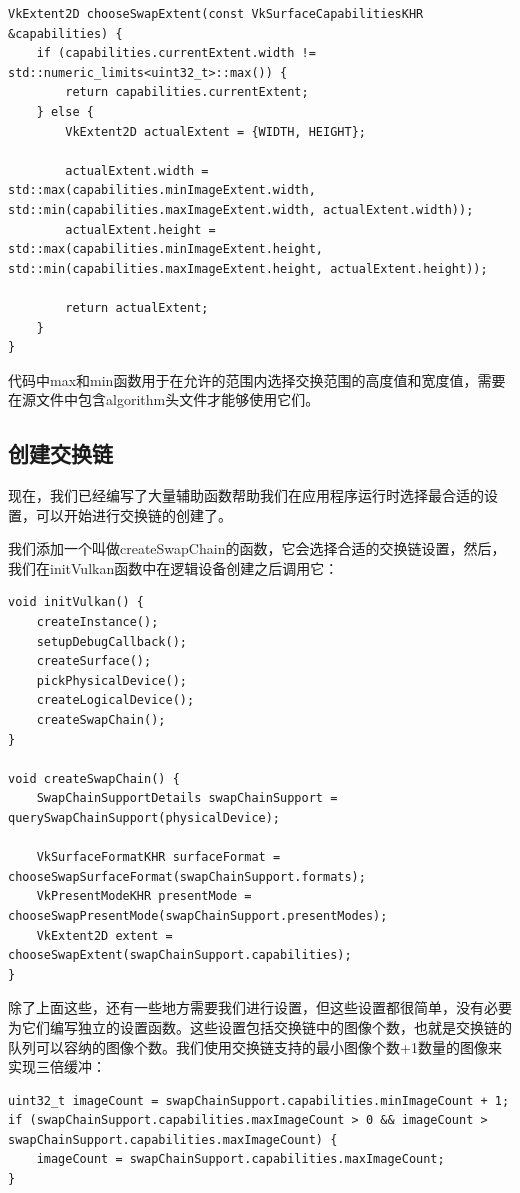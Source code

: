 \documentclass{ctexart}
\begin{document}
\begin{lstlisting}[language={[ANSI]C}]
VkExtent2D chooseSwapExtent(const VkSurfaceCapabilitiesKHR &capabilities) {
	if (capabilities.currentExtent.width != std::numeric_limits<uint32_t>::max()) {
		return capabilities.currentExtent;
	} else {
		VkExtent2D actualExtent = {WIDTH, HEIGHT};

		actualExtent.width = std::max(capabilities.minImageExtent.width, std::min(capabilities.maxImageExtent.width, actualExtent.width));
		actualExtent.height = std::max(capabilities.minImageExtent.height, std::min(capabilities.maxImageExtent.height, actualExtent.height));

		return actualExtent;
	}
}
\end{lstlisting}

代码中max和min函数用于在允许的范围内选择交换范围的高度值和宽度值，需要在源文件中包含algorithm头文件才能够使用它们。

\subsection{创建交换链}

现在，我们已经编写了大量辅助函数帮助我们在应用程序运行时选择最合适的设置，可以开始进行交换链的创建了。

我们添加一个叫做createSwapChain的函数，它会选择合适的交换链设置，然后，我们在initVulkan函数中在逻辑设备创建之后调用它：

\begin{lstlisting}[language={[ANSI]C}]
void initVulkan() {
	createInstance();
	setupDebugCallback();
	createSurface();
	pickPhysicalDevice();
	createLogicalDevice();
	createSwapChain();
}

void createSwapChain() {
	SwapChainSupportDetails swapChainSupport = querySwapChainSupport(physicalDevice);

	VkSurfaceFormatKHR surfaceFormat = chooseSwapSurfaceFormat(swapChainSupport.formats);
	VkPresentModeKHR presentMode = chooseSwapPresentMode(swapChainSupport.presentModes);
	VkExtent2D extent = chooseSwapExtent(swapChainSupport.capabilities);
}
\end{lstlisting}

除了上面这些，还有一些地方需要我们进行设置，但这些设置都很简单，没有必要为它们编写独立的设置函数。这些设置包括交换链中的图像个数，也就是交换链的队列可以容纳的图像个数。我们使用交换链支持的最小图像个数+1数量的图像来实现三倍缓冲：

\begin{lstlisting}[language={[ANSI]C}]
uint32_t imageCount = swapChainSupport.capabilities.minImageCount + 1;
if (swapChainSupport.capabilities.maxImageCount > 0 && imageCount > swapChainSupport.capabilities.maxImageCount) {
	imageCount = swapChainSupport.capabilities.maxImageCount;
}
\end{lstlisting}
\end{document}
